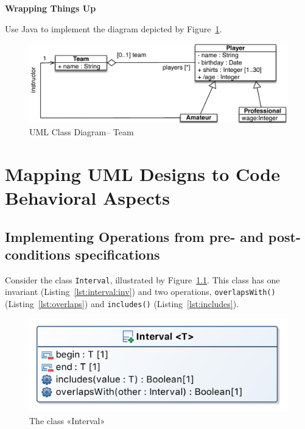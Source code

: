 \documentclass[a4paper,11pt]{memoir}
\newcommand{\code}[1]{\lstinline{#1}}
\begin{document}
\begin{solution}
		\lstset{language=Java}
		
			
\end{solution}

\begin{exercise}
	\textbf{Wrapping Things Up}
	
	Use Java to implement the diagram depicted by Figure~\ref{fig:team}.

	\begin{figure}[htbp]
		\centering
			\includegraphics[width=.8\linewidth]{Team}
		\caption{UML Class Diagram\--- Team}
		\label{fig:team}
	\end{figure}
	
\end{exercise}

\chapter{Mapping UML Designs to Code \\ Behavioral Aspects}

\section{Implementing Operations from pre- and post-conditions specifications}

	Consider the class \code{Interval}, illustrated by Figure~\ref{fig:interval}.
	This class has one invariant (Listing~\ref{lst:interval:inv}) and two operations,
	\code{overlapsWith()} (Listing~\ref{lst:overlaps}) and \code{includes()} (Listing~\ref{lst:includes}).

\begin{figure}[htbp]
	\centering
		\includegraphics[width=.4\linewidth]{Interval.png}
	\caption{The class «Interval»}
	\label{fig:interval}
\end{figure}
\end{document}
